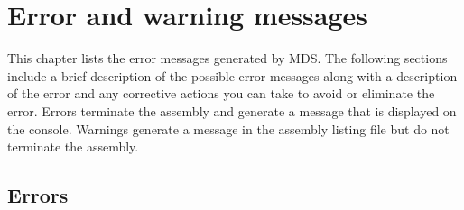     \clearpage

\section{Error and warning messages}
    This chapter lists the error messages generated by MDS. The following sections include a brief description of the possible error messages along with a description of the error and any corrective actions you can take to avoid or eliminate the error. Errors terminate the assembly and generate a message that is displayed on the console. Warnings generate a message in the assembly listing file but do not terminate the assembly.

    \subsection{Errors}
